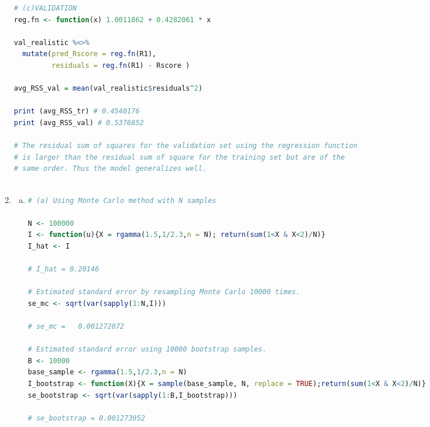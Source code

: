 \documentclass[a4paper,10pt]{article}
\theoremstyle{definition}
\begin{document}
\begin{enumerate}
\begin{lstlisting}[language=R,commentstyle=\fontseries{lc}\color{gray}]
# (c)VALIDATION
reg.fn <- function(x) 1.0011862 + 0.4282061 * x

val_realistic %<>%
  mutate(pred_Rscore = reg.fn(R1),
         residuals = reg.fn(R1) - Rscore )

avg_RSS_val = mean(val_realistic$residuals^2)

print (avg_RSS_tr) # 0.4540176
print (avg_RSS_val) # 0.5376852

# The residual sum of squares for the validation set using the regression function
# is larger than the residual sum of square for the training set but are of the
# same order. Thus the model generalizes well.



\end{lstlisting}
\item
\begin{enumerate}[(a)]
\item 

\begin{lstlisting}[language=R,commentstyle=\fontseries{lc}\color{gray}]
# (a) Using Monte Carlo method with N samples

N <- 100000
I <- function(u){X = rgamma(1.5,1/2.3,n = N); return(sum(1<X & X<2)/N)}
I_hat <- I

# I_hat = 0.20146

# Estimated standard error by resampling Monte Carlo 10000 times.
se_mc <- sqrt(var(sapply(1:N,I)))

# se_mc =   0.001272072

# Estimated standard error using 10000 bootstrap samples.
B <- 10000
base_sample <- rgamma(1.5,1/2.3,n = N)
I_bootstrap <- function(X){X = sample(base_sample, N, replace = TRUE);return(sum(1<X & X<2)/N)}
se_bootstrap <- sqrt(var(sapply(1:B,I_bootstrap)))

# se_bootstrap = 0.001273952


\end{lstlisting}
\end{enumerate}
\end{enumerate}
\end{document}
